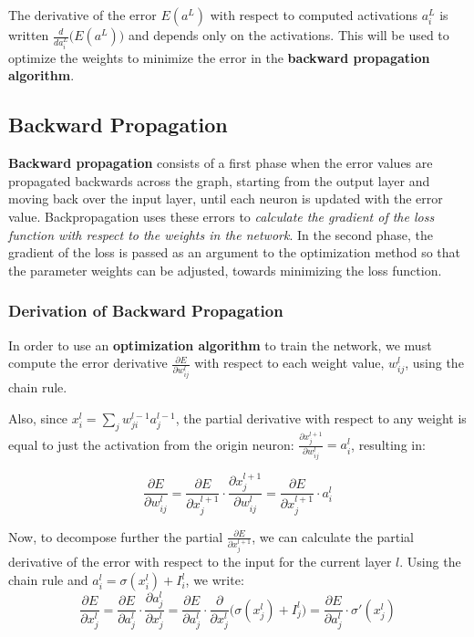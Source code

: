 The derivative of the error $E(a^L)$ with respect to computed activations $a_i^L$ is written $\frac {d} {d a_i^L} \Bigg( E(a^L) \Bigg)$ and depends only on the activations. This will be used to optimize the weights to minimize the error in the \textbf{backward propagation algorithm}.
    

\subsection{Backward Propagation}

\textbf{Backward propagation} consists of a first phase when the error values are propagated backwards across the graph, starting from the output layer and moving back over the input layer, until each neuron is updated with the error value. Backpropagation uses these errors to \emph{calculate the gradient of the loss function with respect to the weights in the network}. In the second phase, the gradient of the loss is passed as an argument to the optimization method so that the parameter weights can be adjusted, towards minimizing the loss function. 

\subsubsection{Derivation of Backward Propagation}

In order to use an \textbf{optimization algorithm} to train the network, we must compute the error derivative $\frac {\partial E} {\partial w_{ij}^l} $ with respect to each weight value, $w_{ij}^l$, using the chain rule. 

Also, since $x_i^l = \sum_j w_{ji}^{l-1} a_j^{l-1}$, the partial derivative with respect to any weight is equal to just the activation from the origin neuron: $\frac {\partial x_j^{l+1}} {\partial w_{ij}^l} = a_i^l$, resulting in:

$$
\frac {\partial E} {\partial w_{ij}^l} 
= \frac {\partial E} {\partial x_j^{l+1} } \cdot \frac {\partial x_j^{l+1}} {\partial w_{ij}^l} 
= \frac {\partial E} {\partial x_j^{l+1} } \cdot a_i^l
$$

Now, to decompose further the partial $\frac {\partial E} {\partial x_j^{l+1} }$, we can calculate the partial derivative of the error with respect to the input for the current layer $l$. Using the chain rule and $a_i^l = \sigma(x_i^l) + I_i^l$, we write:
$$
\frac {\partial E} {\partial x_j^l } = \frac {\partial E} {\partial a_j^l } \cdot \frac {\partial a_j^l} {\partial x_j^l }
= \frac {\partial E} {\partial a_j^l } \cdot  \frac {\partial} {\partial x_j^l } \Big( \sigma(x_j^l) + I_j^l \Big)
= \frac {\partial E} {\partial a_j^l }\cdot \sigma '(x_j^l)
$$

